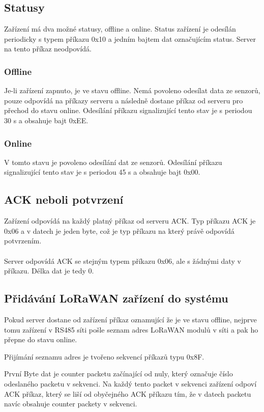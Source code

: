\subsection{Statusy}
Zařízení má dva možné statusy, offline a online. Status zařízení je odesílán periodicky s typem příkazu 0x10 a jedním bajtem dat označujícím status. Server na tento příkaz neodpovídá.

\subsubsection{Offline}
Je-li zařízení zapnuto, je ve stavu offline. Nemá povoleno odesílat data ze senzorů, pouze odpovídá na příkazy serveru a následně dostane příkaz od serveru pro přechod do stavu online. Odesílání příkazu signalizující tento stav je s periodou 30 s a obsahuje bajt 0xEE.

\subsubsection{Online}
V tomto stavu je povoleno odesílání dat ze senzorů. Odesílání příkazu signalizující tento stav je s periodou 45 s a obsahuje bajt 0x00.

\subsection{ACK neboli potvrzení}
Zařízení odpovídá na každý platný příkaz od serveru ACK. Typ příkazu ACK je 0x06 a v datech je jeden byte, což je typ příkazu na který právě odpovídá potvrzením.
\\ \\
Server odpovídá ACK se stejným typem příkazu 0x06, ale s žádnými daty v příkazu. Délka dat je tedy 0.

\subsection{Přidávání LoRaWAN zařízení do systému}
Pokud server dostane od zařízení příkaz oznamující že je ve stavu offline, nejprve tomu zařízení v RS485 síti pošle seznam adres LoRaWAN modulů v síti a pak ho přepne do stavu online.

Přijímání seznamu adres je tvořeno sekvencí příkazů typu 0x8F. 

První Byte dat je counter packetu začínající od nuly, který označuje číslo odeslaného packetu v sekvenci. Na každý tento packet v sekvenci zařízení odpoví ACK příkaz, který se liší od obyčejného ACK příkazu tím, že v datech packetu navíc obsahuje counter packety v sekvenci.

